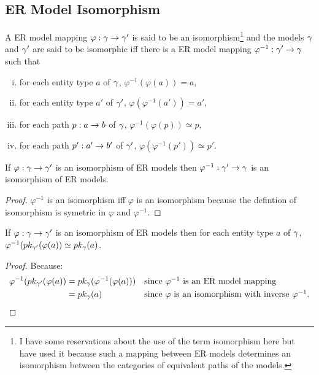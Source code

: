 \subsection{ER Model Isomorphism}

\begin{definition}
A ER model mapping $\varphi: \gmodel \morph \gmodel'$ is said to be an isomorphism\footnote{I have some reservations about the use of the term isomorphism here but have used it because such a mapping
between ER models determines an isomorphism between the  categories of equivalent paths of the models.}
and the models $\gmodel$ and $\gmodel'$ are said to be isomorphic iff there is a ER model mapping $\varphi^{-1}: \gmodel' \morph \gmodel$ such that
\begin{enumerate}[(i)]
\item for each entity type $a$ of $\gmodel$, $\varphi^{-1}(\varphi(a))=a$,
\item for each entity type $a'$ of $\gmodel'$, $\varphi(\varphi^{-1}(a'))=a'$,
\item for each path $p: a \morph b$ of $\gmodel$, $\varphi^{-1}(\varphi(p)) \simeq p$,
\item for each path $p':a' \morph b'$ of $\gmodel'$, $\varphi(\varphi^{-1}(p')) \simeq p'$.
\end{enumerate}
\end{definition}

\begin{lemma}
 
If $\varphi: \gmodel \morph \gmodel'$ is an isomorphism of ER models then
$\varphi^{-1}: \gmodel' \morph \gmodel$ is an isomorphism of ER models.
\end{lemma}
\begin{proof}
$\varphi^{-1}$ is an isomorphism iff $\varphi$ is an isomorphism because the defintion of isomorphism is symetric in $\varphi$ and $\varphi^{-1}$.
\end{proof}

\begin{lemma}
 
If $\varphi: \gmodel \morph \gmodel'$ is an isomorphism of ER models then
for each entity type $a$ of $\gmodel$, $\varphi^{-1}(\pk[\gmodel']{\varphi(a)}\simeq\pk{a}$.
\end{lemma}
\begin{proof}
Because:
\begin{align*}
\varphi^{-1}(\pk[\gmodel']{\varphi(a)}&=\pk{\varphi^{-1}(\varphi(a))} & & \mbox{since $\varphi^{-1}$ is an ER model mapping }\\
			                                &=\pk{a}& & \mbox{since $\varphi$ is an isomorphism with inverse $\varphi^{-1}$.}
\end{align*}
\end{proof}

